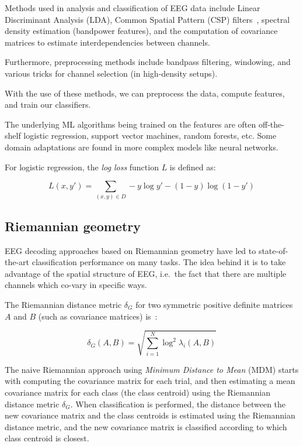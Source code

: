    Methods used in analysis and classification of EEG data include Linear Discriminant Analysis (LDA), Common Spatial Pattern (CSP) filters~\cite{barachant_common_2010}, spectral density estimation (bandpower features), and the computation of covariance matrices to estimate interdependencies between channels. 

    Furthermore, preprocessing methods include bandpass filtering, windowing, and various tricks for channel selection (in high-density setups). 

    With the use of these methods, we can preprocess the data, compute features, and train our classifiers.

    The underlying ML algorithms being trained on the features are often off-the-shelf logistic regression, support vector machines, random forests, etc. Some domain adaptations are found in more complex models like neural networks.

    For logistic regression, the \emph{log loss} function $L$ is defined as:

    \[ L(x, y') = \sum_{(x,y) \in D} -y \log y' - (1 - y) \log(1 - y')\]

    \subsection{Riemannian geometry}\label{section:riemannian-theory}


        EEG decoding approaches based on Riemannian geometry have led to state-of-the-art classification performance on many tasks. The idea behind it is to take advantage of the spatial structure of EEG, i.e.\ the fact that there are multiple channels which co-vary in specific ways.

        The Riemannian distance metric $\delta_G$ for two symmetric positive definite matrices $A$ and $B$ (such as covariance matrices) is~\cite{grafarend_metric_2003}:

        \[ \delta_G(A, B) = \sqrt{\sum_{i=1}^N \log^2 \lambda_i (A, B) } \]

        The naive Riemannian approach using \emph{Minimum Distance to Mean} (MDM) starts with computing the covariance matrix for each trial, and then estimating a mean covariance matrix for each class (the class centroid) using the Riemannian distance metric $\delta_G$. When classification is performed, the distance between the new covariance matrix and the class centroids is estimated using the Riemannian distance metric, and the new covariance matrix is classified according to which class centroid is closest.

